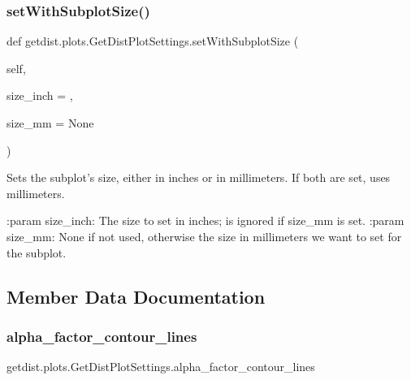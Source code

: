 \mbox{\label{classgetdist_1_1plots_1_1GetDistPlotSettings_aa0678c44b75bfe8ab3560374e57cecbe}} 
\subsubsection{\texorpdfstring{set\+With\+Subplot\+Size()}{setWithSubplotSize()}}
{\footnotesize\ttfamily def getdist.\+plots.\+Get\+Dist\+Plot\+Settings.\+set\+With\+Subplot\+Size (\begin{DoxyParamCaption}\item[{}]{self,  }\item[{}]{size\+\_\+inch = {},  }\item[{}]{size\+\_\+mm = {\ttfamily None} }\end{DoxyParamCaption})}

\begin{DoxyVerb}Sets the subplot's size, either in inches or in millimeters.
If both are set, uses millimeters.

:param size_inch: The size to set in inches; is ignored if size_mm is set.
:param size_mm: None if not used, otherwise the size in millimeters we want to set for the subplot.
\end{DoxyVerb}
 

\subsection{Member Data Documentation}
\mbox{\label{classgetdist_1_1plots_1_1GetDistPlotSettings_ab861728d7817f90ea8c9faf9bf1b49ad}} 
\subsubsection{\texorpdfstring{alpha\+\_\+factor\+\_\+contour\+\_\+lines}{alpha\_factor\_contour\_lines}}
{\footnotesize\ttfamily getdist.\+plots.\+Get\+Dist\+Plot\+Settings.\+alpha\+\_\+factor\+\_\+contour\+\_\+lines}

